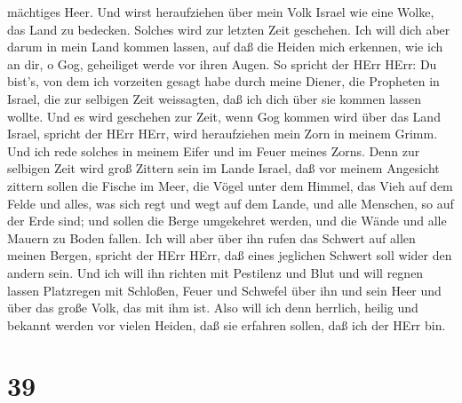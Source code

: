 mächtiges Heer.  Und wirst heraufziehen über mein Volk
Israel wie eine Wolke, das Land zu bedecken. Solches wird zur letzten
Zeit geschehen. Ich will dich aber darum in mein Land kommen lassen, auf
daß die Heiden mich erkennen, wie ich an dir, o Gog, geheiliget werde
vor ihren Augen.  So spricht der HErr HErr: Du bist's, von
dem ich vorzeiten gesagt habe durch meine Diener, die Propheten in
Israel, die zur selbigen Zeit weissagten, daß ich dich über sie kommen
lassen wollte.  Und es wird geschehen zur Zeit, wenn Gog
kommen wird über das Land Israel, spricht der HErr HErr, wird
heraufziehen mein Zorn in meinem Grimm.  Und ich rede
solches in meinem Eifer und im Feuer meines Zorns. Denn zur selbigen
Zeit wird groß Zittern sein im Lande Israel,  daß vor
meinem Angesicht zittern sollen die Fische im Meer, die Vögel unter dem
Himmel, das Vieh auf dem Felde und alles, was sich regt und wegt auf dem
Lande, und alle Menschen, so auf der Erde sind; und sollen die Berge
umgekehret werden, und die Wände und alle Mauern zu Boden fallen.
 Ich will aber über ihn rufen das Schwert auf allen meinen
Bergen, spricht der HErr HErr, daß eines jeglichen Schwert soll wider
den andern sein.  Und ich will ihn richten mit Pestilenz
und Blut und will regnen lassen Platzregen mit Schloßen, Feuer und
Schwefel über ihn und sein Heer und über das große Volk, das mit ihm
ist.  Also will ich denn herrlich, heilig und bekannt
werden vor vielen Heiden, daß sie erfahren sollen, daß ich der HErr bin.

\hypertarget{section-38}{%
\section{39}\label{section-38}}

